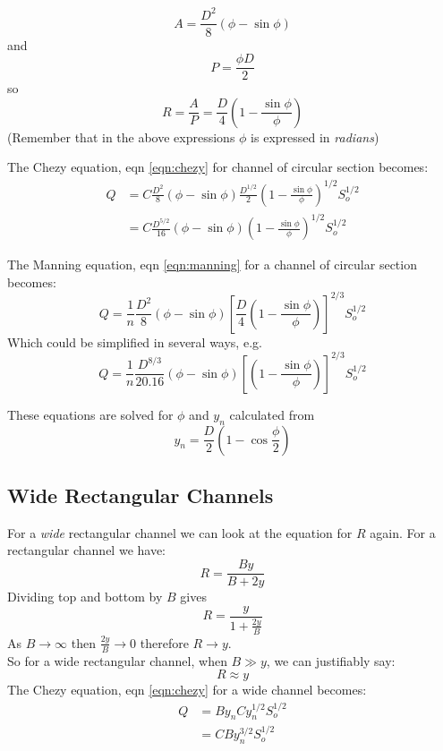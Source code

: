 \documentclass[a4paper, 12pt, british]{article} %
\numberwithin{equation}{section}
\numberwithin{figure}{section}
\numberwithin{table}{section}
\begin{document}
	\[ 
	A = \frac{D^2}{8}(\phi - \sin \phi)
	\] 
	and 
	\[
	P = \frac{\phi D}{2}
	\]
	so
	\[
	R = \frac{A}{P} = \frac{D}{4}\left(1-\frac{\sin \phi}{\phi}\right)
	\]
	(Remember that in the above expressions $\phi$ is expressed in \textit{radians})
	
	The Chezy equation, eqn \ref{eqn:chezy} for channel of circular section becomes:
	\begin{align}
	Q &= C  \frac{D^2}{8}(\phi - \sin \phi)  \frac{D^{1/2}}{2}\left(1-\frac{\sin \phi}{\phi}\right)^{1/2} S_o^{1/2} \nonumber \\
	&= C  \frac{D^{5/2}}{16}(\phi - \sin \phi)  \left(1-\frac{\sin \phi}{\phi}\right)^{1/2} S_o^{1/2}
	\label{eqn:chezy_circ}
	\end{align}
	
	The Manning equation, eqn \ref{eqn:manning} for a channel of circular section  becomes:
	\begin{equation}
	Q = \frac{1}{n}  \frac{D^2}{8}(\phi - \sin \phi)
	\left[\frac{D}{4}\left(1-\frac{\sin \phi}{\phi}\right)\right]^{2/3} S_o^{1/2}
	\label{eqn:manning_circ}
	\end{equation}
	Which could be simplified in several ways, e.g.
	\begin{equation*}
	Q = \frac{1}{n}  \frac{D^{8/3}}{20.16}(\phi - \sin \phi)
	\left[\left(1-\frac{\sin \phi}{\phi}\right)\right]^{2/3} S_o^{1/2}
	\label{eqn:manning_circ2}
	\end{equation*}
	
	These equations are solved for $\phi$ and $y_n$ calculated from 
	\begin{equation*}
	y_n = \frac{D}{2} \left( 1 - \cos \frac{\phi}{2} \right)
	\end{equation*}
	
	
	
	\subsection*{Wide Rectangular Channels}
	For a \textit{wide} rectangular channel we can look at the equation for $R$ again. For a rectangular channel we have:
	\begin{equation*}
	R = \frac{By}{B+2y}
	\end{equation*}
	Dividing top and bottom by $B$ gives
	\begin{equation*}
	R = \frac{y}{1+\frac{2y}{B}}
	\end{equation*}
	As $B \to \infty$ then $\frac{2y}{B} \to 0$ therefore $R \to y$. \\
	So for a wide rectangular channel, when $B \gg y$, we can justifiably say:
	\begin{equation}
	R \approx y
	\end{equation}
	The Chezy equation, eqn \ref{eqn:chezy} for a wide channel becomes:
	\begin{align}
	Q &= By_{n} C y_{n}^{1/2} S_o^{1/2} \nonumber \\
	&= CBy_{n}^{3/2}S_o^{1/2}
	\label{eqn:chezy_wide}
	\end{align}
	
\end{document}
